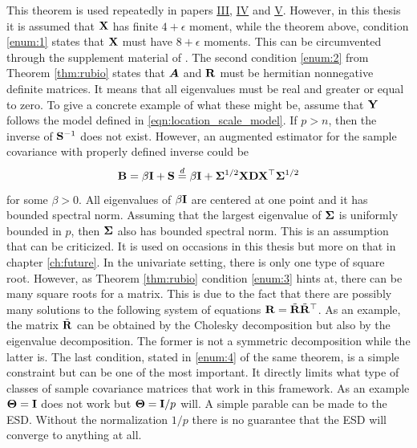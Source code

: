 \documentclass[12pt, twoside]{book}\usepackage{knitr}
\begin{document}
This theorem is used repeatedly in papers \hyperref[sec:paper3]{III}, \hyperref[sec:paper4]{IV} and \hyperref[sec:paper5]{V}.
However, in this thesis it is assumed that $\mathbf{X}$ has finite $4+\epsilon$ moment, while the theorem above, condition \eqref{enum:1} states that $\mathbf{X}$ must have $8+\epsilon$ moments. 
This can be circumvented through the supplement material of \citet{BodnarGuptaParolya2016}.
The second condition \eqref{enum:2} from Theorem \ref{thm:rubio} states that $\mbox{\boldmath$A$}$ and $\mathbf{R}$ must be hermitian nonnegative definite matrices.
It means that all eigenvalues must be real and greater or equal to zero.
To give a concrete example of what these might be, assume that $\mathbf{Y}$ follows the model defined in \eqref{eqn:location_scale_model}.
If $p>n$, then the inverse of $\mathbf{S}^{-1}$ does not exist.
However, an augmented estimator for the sample covariance with properly defined inverse could be 
\begin{equation}\label{eqn:bb}
\mathbf{B} = \beta\mathbf{I} + \mathbf{S} \stackrel{d}{=} \beta \mathbf{I} + \mathbf{\Sigma}^{1/2}\mathbf{X} \mathbf{D} \mathbf{X}^\top \mathbf{\Sigma}^{1/2}
\end{equation}
for some $\beta >0$.
All eigenvalues of $\beta \mathbf{I}$ are centered at one point and it has bounded spectral norm. 
Assuming that the largest eigenvalue of $\mathbf{\Sigma}$ is uniformly bounded in $p$, then $\mathbf{\Sigma}$ also has bounded spectral norm.
This is an assumption that can be criticized.
It is used on occasions in this thesis but more on that in chapter \ref{ch:future}.
In the univariate setting, there is only one type of square root.
However, as Theorem \ref{thm:rubio} condition \eqref{enum:3} hints at, there can be many square roots for a matrix.
This is due to the fact that there are possibly many solutions to the following system of equations $\mathbf{R} = \tilde{\mathbf{R}} \tilde{\mathbf{R}}^\top$.
As an example, the matrix $\tilde {\mathbf{R}}$ can be obtained by the Cholesky decomposition but also by the eigenvalue decomposition.
The former is not a symmetric decomposition while the latter is.
The last condition, stated in \eqref{enum:4} of the same theorem, is a simple constraint but can be one of the most important. 
It directly limits what type of classes of sample covariance matrices that work in this framework.
As an example $\mathbf{\Theta}=\mathbf{I}$ does not work but $\mathbf{\Theta} = \mathbf{I} / p$ will.
A simple parable can be made to the ESD.
Without the normalization $1/p$ there is no guarantee that the ESD will converge to anything at all.
\end{document}

